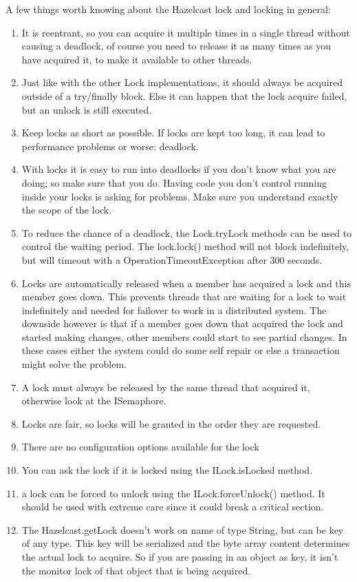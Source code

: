 A few things worth knowing about the Hazelcast lock and locking in general:
\begin{enumerate}
\item It is reentrant, so you can acquire it multiple times in a single thread without causing a deadlock, of course you need to release it as many times as you have acquired it, to make it available to other threads.
\item Just like with the other Lock implementations, it should always be acquired outside of a try/finally block. Else it can happen that the lock acquire failed, but an unlock is still executed. 
\item Keep locks as short as possible. If locks are kept too long, it can lead to performance problems or worse: deadlock.
\item With locks it is easy to run into deadlocks if you don't know what you are doing; so make sure that you do. Having code you don't control running inside your locks is asking for problems. Make sure you understand exactly the scope of the lock. 
\item To reduce the chance of a deadlock, the Lock.tryLock methods can be used to control the waiting period. The lock.lock() method will not block indefinitely, but will timeout with a OperationTimeoutException after 300 seconds.  
\item Locks are automatically released when a member has acquired a lock and this member goes down. This prevents threads that are waiting for a lock to wait indefinitely and needed for failover to work in a distributed system. The downside however is that if a member goes down that acquired the lock and started making changes, other members could start to see partial changes. In these cases either the system could do some self repair or else a transaction might solve the problem.
\item A lock must always be released by the same thread that acquired it, otherwise look at the ISemaphore.
\item Locks are fair, so locks will be granted in the order they are requested.
\item There are no configuration options available for the lock
\item You can ask the lock if it is locked using the ILock.isLocked method.
\item a lock can be forced to unlock using the ILock.forceUnlock() method. It should be used with extreme care since it could break a critical section. 
\item The Hazelcast.getLock doesn't work on name of type String, but can be key of any type. This key will be serialized and the byte array content determines the actual lock to acquire. So if you are passing in an object as key, it isn't the monitor lock of that object that is being acquired.
\end{enumerate}

